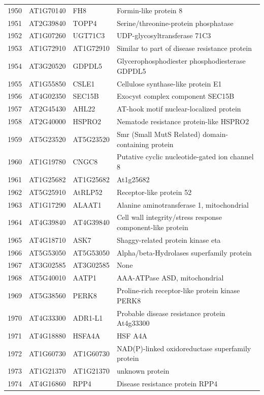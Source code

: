 \documentclass[11pt]{article}
\begin{document}
\begin{center}
\begin{tabular}{rlll}
1950 & AT1G70140 & FH8 & Formin-like protein 8\\
1951 & AT2G39840 & TOPP4 & Serine/threonine-protein phosphatase\\
1952 & AT1G07260 & UGT71C3 & UDP-glycosyltransferase 71C3\\
1953 & AT1G72910 & AT1G72910 & Similar to part of disease resistance protein\\
1954 & AT3G20520 & GDPDL5 & Glycerophosphodiester phosphodiesterase GDPDL5\\
1955 & AT1G55850 & CSLE1 & Cellulose synthase-like protein E1\\
1956 & AT4G02350 & SEC15B & Exocyst complex component SEC15B\\
1957 & AT2G45430 & AHL22 & AT-hook motif nuclear-localized protein\\
1958 & AT2G40000 & HSPRO2 & Nematode resistance protein-like HSPRO2\\
1959 & AT5G23520 & AT5G23520 & Smr (Small MutS Related) domain-containing protein\\
1960 & AT1G19780 & CNGC8 & Putative cyclic nucleotide-gated ion channel 8\\
1961 & AT1G25682 & AT1G25682 & At1g25682\\
1962 & AT5G25910 & AtRLP52 & Receptor-like protein 52\\
1963 & AT1G17290 & ALAAT1 & Alanine aminotransferase 1, mitochondrial\\
1964 & AT4G39840 & AT4G39840 & Cell wall integrity/stress response component-like protein\\
1965 & AT4G18710 & ASK7 & Shaggy-related protein kinase eta\\
1966 & AT5G53050 & AT5G53050 & Alpha/beta-Hydrolases superfamily protein\\
1967 & AT3G02585 & AT3G02585 & None\\
1968 & AT5G40010 & AATP1 & AAA-ATPase ASD, mitochondrial\\
1969 & AT5G38560 & PERK8 & Proline-rich receptor-like protein kinase PERK8\\
1970 & AT4G33300 & ADR1-L1 & Probable disease resistance protein At4g33300\\
1971 & AT4G18880 & HSFA4A & HSF A4A\\
1972 & AT1G60730 & AT1G60730 & NAD(P)-linked oxidoreductase superfamily protein\\
1973 & AT1G21370 & AT1G21370 & unknown protein\\
1974 & AT4G16860 & RPP4 & Disease resistance protein RPP4\\

\end{tabular}
\end{center}
\end{document}
